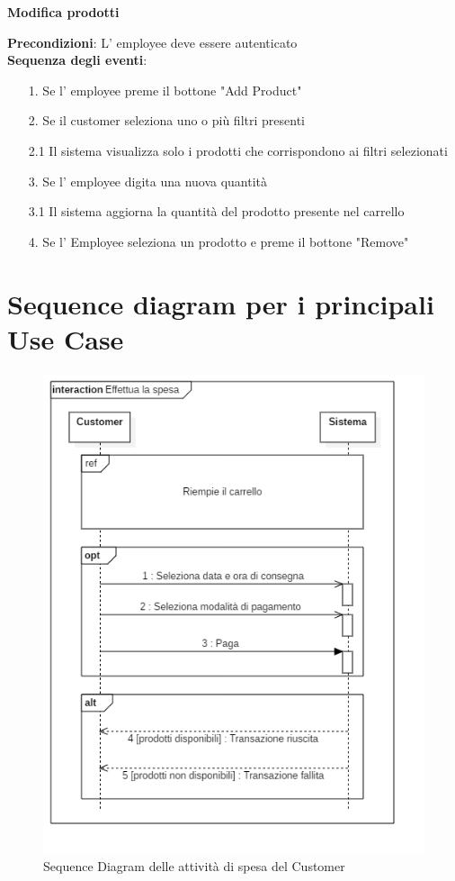 \documentclass[12pt]{article}
\begin{document}
\textbf{Modifica prodotti}
\begin{tcolorbox}
\textbf{Precondizioni}: L' employee deve essere autenticato
\\
\textbf{Sequenza degli eventi}:
	\begin{itemize}
	\item[1.] Se l' employee preme il bottone "Add Product"
	\item[2.] Se il customer seleziona uno o più filtri presenti
	\item[2.1] Il sistema visualizza solo i prodotti che corrispondono ai filtri selezionati
	\item[3.] Se l' employee digita una nuova quantità
	\item[3.1] Il sistema aggiorna la quantità del prodotto presente nel carrello
	\item[4.] Se l' Employee seleziona un prodotto e preme il bottone "Remove"
	\end{itemize}
\end{tcolorbox}




\section{Sequence diagram per i principali Use Case}

\begin{figure}[h!]
	\begin{center}
 	 	\includegraphics[keepaspectratio]{media/diagrams/sequence/effettua_spesa.png}
  	 	 \caption{Sequence Diagram delle attività di spesa del Customer}
	\end{center}
\end{figure}
\end{document}
